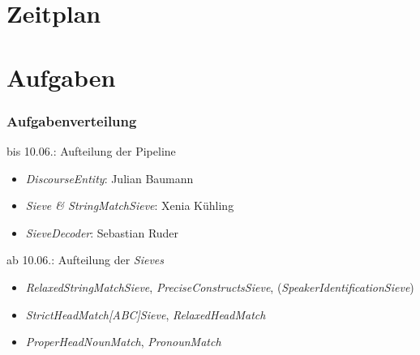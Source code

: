 \documentclass[11pt,a4paper]{beamer}
\begin{document}
\section{Zeitplan}

\begin{frame}

    \begin{gantt}{10}{9}
    \begin{ganttitle}
    \end{ganttitle}
    \begin{ganttitle}
    \end{ganttitle}
  \end{gantt}
  
\end{frame}

\section{Aufgaben}

\begin{frame}
\frametitle{Aufgabenverteilung}

bis 10.06.: Aufteilung der Pipeline 
\begin{itemize}
  \item \textit{DiscourseEntity}: Julian Baumann
  \item \textit{Sieve \& StringMatchSieve}: Xenia Kühling
  \item \textit{SieveDecoder}: Sebastian Ruder
\end{itemize}
ab 10.06.: Aufteilung der \textit{Sieves}
\begin{itemize}
  \item \textit{RelaxedStringMatchSieve}, \textit{PreciseConstructsSieve}, (\textit{SpeakerIdentificationSieve})
  \item \textit{StrictHeadMatch[ABC]Sieve}, \textit{RelaxedHeadMatch}
  \item \textit{ProperHeadNounMatch}, \textit{PronounMatch}
\end{itemize}

\end{frame}
\end{document}

